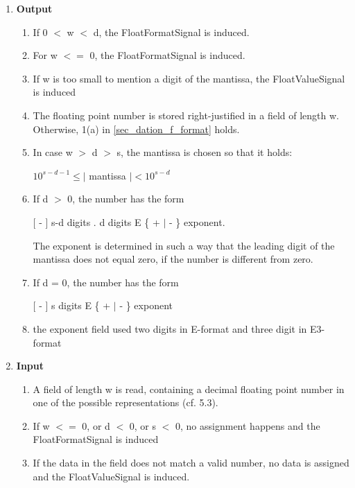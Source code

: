 \begin{accepted}
\begin{enumerate}
\item {\bf Output}\\
\begin{enumerate}
\item If 0 $<$ w $<$ d, the FloatFormatSignal is induced. 

\item For w $<=$ 0, the FloatFormatSignal is induced.

\item If w is too small to mention a digit of the mantissa, the FloatValueSignal is induced

\item The floating point number is stored right-justified in a field of length
w. Otherwise, 1(a) in \ref{sec_dation_f_format} holds.

\item In case w $>$ d $>$ s, the mantissa is chosen so that it holds:

\hspace*{1cm}$10^{s-d-1} \leq \mid$ mantissa $\mid < 10^{s-d}$

\item If d $>$ 0, the number has the form

\hspace*{1cm}[ - ] s-d digits . d digits E \{ + $\mid$ - \} exponent.

The exponent is determined in such a way that the leading digit of the
mantissa does not equal zero, if the number is different from zero.

\item If d = 0, the number has the form

\hspace*{1cm}[ - ] s digits E \{ + $\mid$ - \} exponent

\item the exponent field used two digits in E-format and 
      three digit in E3-format

\end{enumerate}
 
\item {\bf Input}\\
\begin{enumerate}
\item A field of length w is read,
    containing a decimal floating point number
    in one of the possible representations (cf. 5.3).

\item If w $<=$ 0, or d $<$ 0, or s $<$ 0, no assignment happens and  
         the FloatFormatSignal is induced
\item If the data in the field does not match a valid number, 
 no data is assigned and the FloatValueSignal is induced.
\end{enumerate}
\end{enumerate}


\end{accepted}

